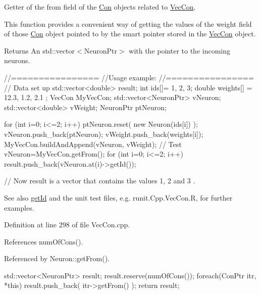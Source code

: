 Getter of the from field of the \hyperlink{class_con}{Con} objects related to \hyperlink{class_vec_con}{VecCon}. 

This function provides a convenient way of getting the values of the weight field of those \hyperlink{class_con}{Con} object pointed to by the smart pointer stored in the \hyperlink{class_vec_con}{VecCon} object.

\begin{DoxyReturn}{Returns}
An std::vector$<$NeuronPtr$>$ with the pointer to the incoming neurons.
\end{DoxyReturn}

\begin{DoxyCode}
        //================
        //Usage example:
        //================
        // Data set up
                std::vector<double> result;
                int ids[]= {1, 2, 3};
                double weights[] = {12.3, 1.2, 2.1 };
                VecCon MyVecCon;
                std::vector<NeuronPtr> vNeuron;
                std::vector<double> vWeight;
                NeuronPtr ptNeuron;

                        for (int i=0; i<=2; i++) {
                                ptNeuron.reset( new Neuron(ids[i]) );
                                vNeuron.push_back(ptNeuron);
                                vWeight.push_back(weights[i]);
                        }
                        MyVecCon.buildAndAppend(vNeuron, vWeight);
                // Test
                        vNeuron=MyVecCon.getFrom();
                        for (int i=0; i<=2; i++) {
                                result.push_back(vNeuron.at(i)->getId());
                        }

        // Now result is a vector that contains the values 1, 2 and 3 .
\end{DoxyCode}


\begin{DoxySeeAlso}{See also}
\hyperlink{class_vec_con_a03d5dde143e166e68b01c9596573eb5f}{getId} and the unit test files, e.g. runit.Cpp.VecCon.R, for further examples. 
\end{DoxySeeAlso}


Definition at line 298 of file VecCon.cpp.



References numOfCons().



Referenced by Neuron::getFrom().


\begin{DoxyCode}
                                            {
        std::vector<NeuronPtr> result;
        result.reserve(numOfCons());
        foreach(ConPtr itr, *this){
                result.push_back( itr->getFrom() );
        }
        return result;
}
\end{DoxyCode}


